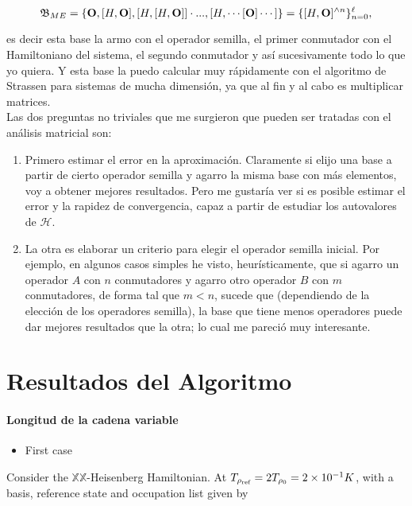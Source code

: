 \documentclass{homework}
\begin{document}
$$
    \mathfrak{B}_{ME} = \{{\bf O}, [H, {\bf O}], [H, [H, {\bf O}]] \cdot..., [H, \cdots[ {\bf O}]\cdots]\} = \{[H, {\bf O}]^{\land n}\}_{n=0}^{\ell},
$$

es decir esta base la armo con el operador semilla, el primer conmutador con el Hamiltoniano del sistema, el segundo conmutador y así sucesivamente todo lo que yo quiera. Y esta base la puedo calcular muy rápidamente con el algoritmo de Strassen para sistemas de mucha dimensión, ya que al fin y al cabo es multiplicar matrices. \\

Las dos preguntas no triviales que me surgieron que pueden ser tratadas con el análisis matricial son:

\begin{enumerate}
    \item  Primero estimar el error en la aproximación. Claramente si elijo una base a partir de cierto operador semilla y agarro la misma base con más elementos, voy a obtener mejores resultados. Pero me gustaría ver si es posible estimar el error y la rapidez de convergencia, capaz a partir de estudiar los autovalores de $\bm{\mathcal{H}}$.
    
    \item La otra es elaborar un criterio para elegir el operador semilla inicial. Por ejemplo, en algunos casos simples he visto, heurísticamente, que si agarro un operador $A$ con $n$ conmutadores y agarro otro operador $B$ con $m$ conmutadores, de forma tal que $m < n$, sucede que (dependiendo de la elección de los operadores semilla), la base que tiene menos operadores puede dar mejores resultados que la otra; lo cual me pareció muy interesante. 
\end{enumerate}

\clearpage

\section{Resultados del Algoritmo}

\paragraph{Longitud de la cadena variable}

\begin{itemize}
    \item First case
\end{itemize}

Consider the $\mathds{X}\mathds{X}$-Heisenberg Hamiltonian. At $T_{\rho_{\textnormal{ref}}} = 2T_{\rho_{0}} = 2 \times 10^{-1} K$, with a basis, reference state and occupation list given by
\end{document}
